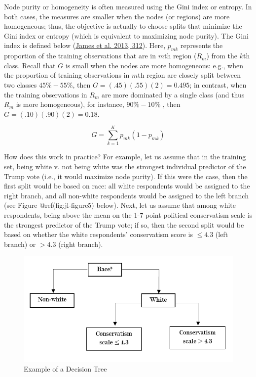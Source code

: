 \documentclass{book}
\begin{document}
Node purity or homogeneity is often measured using the Gini index or entropy.
In both cases, the measures are smaller when the nodes (or regions) are more
homogeneous; thus, the objective is actually to choose splits that minimize
the Gini index or entropy (which is equivalent to maximizing node purity). The
Gini index is defined below (\protect\hyperlink{ref-james2013a}{James et al.
2013, 312}). Here, \(p_{mk}\) represents the proportion of the training
observations that are in \(m\)th region (\(R_{m}\)) from the \(k\)th class.
Recall that \(G\) is small when the nodes are more homogeneous: e.g., when the
proportion of training observations in \(m\)th region are closely split
between two classes \(45\% -55\%\), then \(G = (.45)(.55)(2) =0.495\); in
contrast, when the training observations in \(R_{m}\) are more dominated by a
single class (and thus \(R_{m}\) is more homogeneous), for instance,
\(90\% -10\%\) , then \(G = (.10)(.90)(2) = 0.18\).

\[G= \sum _{k=1}^{K}p_{mk} \left( 1-p_{mk} \right)\]

How does this work in practice? For example, let us assume that in the
training set, being white v. not being white was the strongest individual
predictor of the Trump vote (i.e., it would maximize node purity). If this
were the case, then the first split would be based on race: all white
respondents would be assigned to the right branch, and all non-white
respondents would be assigned to the left branch (see Figure
@ref(fig:jl-figure5) below). Next, let us assume that among white respondents,
being above the mean on the 1-7 point political conservatism scale is the
strongest predictor of the Trump vote; if so, then the second split would be
based on whether the white respondents' conservatism score is \(\leq 4.3\)
(left branch) or \(> 4.3\) (right branch).

\begin{figure}
\hypertarget{fig:jl-figure5}{%
\centering
\includegraphics{images/ml/jl-figure5.png}
\caption{Example of a Decision Tree}\label{fig:jl-figure5}
}
\end{figure}
\end{document}

